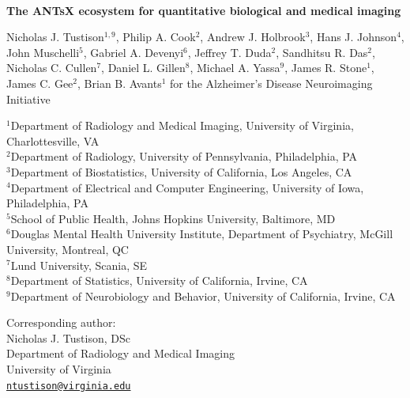 \documentclass[12pt,]{article}
\author{}
\date{\vspace{-2.5em}}
\begin{document}


\begin{centering}

$ $

\vspace{4.cm}

\LARGE

{\bf The ANTsX ecosystem for quantitative biological and medical imaging}

\vspace{0.5 cm}

\normalsize

Nicholas J. Tustison$^{1,9}$,
Philip A. Cook$^{2}$,
Andrew J. Holbrook$^{3}$,
Hans J. Johnson$^{4}$,
John Muschelli$^{5}$,
Gabriel A. Devenyi$^{6}$,
Jeffrey T. Duda$^{2}$,
Sandhitsu R. Das$^{2}$,
Nicholas C. Cullen$^{7}$,
Daniel L. Gillen$^{8}$,
Michael A. Yassa$^{9}$,
James R. Stone$^{1}$,
James C. Gee$^{2}$,
Brian B. Avants$^{1}$
for the Alzheimer’s Disease Neuroimaging Initiative

\footnotesize

$^{1}$Department of Radiology and Medical Imaging, University of Virginia, Charlottesville, VA \\
$^{2}$Department of Radiology, University of Pennsylvania, Philadelphia, PA \\
$^{3}$Department of Biostatistics, University of California, Los Angeles, CA \\
$^{4}$Department of Electrical and Computer Engineering, University of Iowa, Philadelphia, PA \\
$^{5}$School of Public Health, Johns Hopkins University, Baltimore, MD \\
$^{6}$Douglas Mental Health University Institute, Department of Psychiatry, McGill University, Montreal, QC \\
$^{7}$Lund University, Scania, SE \\
$^{8}$Department of Statistics, University of California, Irvine, CA \\
$^{9}$Department of Neurobiology and Behavior, University of California, Irvine, CA \\

\end{centering}

\vspace{4.5 cm}

\scriptsize

Corresponding author:\\
Nicholas J. Tustison, DSc\\
Department of Radiology and Medical Imaging\\
University of Virginia\\
\href{mailto:ntustison@virginia.edu}{\nolinkurl{ntustison@virginia.edu}}
\end{document}
